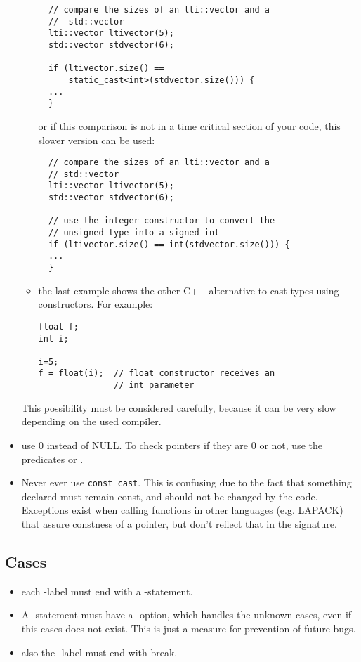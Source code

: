 \begin{itemize}
\begin{itemize}
\begin{verbatim}
  // compare the sizes of an lti::vector and a
  //  std::vector
  lti::vector ltivector(5);
  std::vector stdvector(6);

  if (ltivector.size() ==
      static_cast<int>(stdvector.size())) {
  ...
  }
\end{verbatim}

or if this comparison is not in a time critical section of your code, this
slower version can be used:
\begin{verbatim}
  // compare the sizes of an lti::vector and a
  // std::vector
  lti::vector ltivector(5);
  std::vector stdvector(6);

  // use the integer constructor to convert the
  // unsigned type into a signed int
  if (ltivector.size() == int(stdvector.size())) {
  ...
  }
\end{verbatim}

\item the last example shows the other C++ alternative to cast types using
  constructors.  For example:
\begin{verbatim}
float f;
int i;

i=5;
f = float(i);  // float constructor receives an
               // int parameter
\end{verbatim}
\end{itemize}

This possibility must be considered carefully, because it can be very slow depending on the used
compiler.
\item use 0 instead of NULL. To check pointers if they are 0 or not, use the
  predicates  or .
\item Never ever use \verb+const_cast+.  This is confusing due to the
  fact that something declared  must remain const, and
  should not be changed by the code. Exceptions exist when calling
  functions in other languages (e.g. LAPACK) that assure constness of
  a pointer, but don't reflect that in the signature.
\end{itemize}

\subsection{Cases}

\begin{itemize}
\item each -label must end with a -statement.
\item A -statement must have a -option, which
  handles the unknown cases, even if this cases does not exist.  This is just
  a measure for prevention of future bugs.
\item also the -label must end with break.
\end{itemize}

